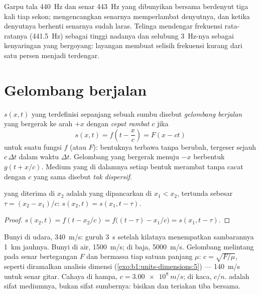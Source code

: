 \begin{example}\label{ex:b1:wave-propagation:tuning}
Garpu tala \qty{440}{Hz} dan senar \qty{443}{Hz} yang dibunyikan
bersama berdenyut tiga kali tiap sekon; mengencangkan senarnya
memperlambat denyutnya, dan ketika denyutnya berhenti senarnya sudah
laras. Telinga mendengar frekuensi rata-ratanya (\qty{441.5}{Hz})
sebagai tinggi nadanya dan selubung \qty{3}{Hz}-nya sebagai kenyaringan
yang bergoyang: layangan membuat selisih frekuensi kurang dari satu
persen menjadi terdengar.
\end{example}

\section{Gelombang berjalan}

\begin{definition}\label{def:b1:wave-propagation:travelling}
 $s(x, t)$ yang terdefinisi sepanjang sebuah sumbu disebut
\emph{gelombang berjalan} yang bergerak ke arah $+x$ dengan
\emph{cepat rambat} $c$ jika
\[
s(x, t) = f\!\left(t - \frac{x}{c}\right) = F(x - ct)
\]
untuk suatu fungsi $f$ (atau $F$): bentuknya terbawa tanpa berubah,
tergeser sejauh $c\,\Delta t$ dalam waktu $\Delta t$. Gelombang yang
bergerak menuju $-x$ berbentuk $g(t + x/c)$. Medium yang di dalamnya
setiap bentuk merambat tanpa cacat dengan $c$ yang sama disebut
\emph{tak dispersif}.
\end{definition}

\begin{proposition}[Tundaan]\label{prop:b1:wave-propagation:delay}
 yang diterima di $x_2$ adalah  yang dipancarkan di
$x_1 < x_2$, tertunda sebesar $\tau = (x_2 - x_1)/c$:
$s(x_2, t) = s(x_1, t - \tau)$.
\end{proposition}

\begin{proof}
$s(x_2, t) = f(t - x_2/c) = f\big((t - \tau) - x_1/c\big) = s(x_1, t - \tau)$.
\end{proof}

\begin{example}\label{ex:b1:wave-propagation:celerities}
Bunyi di udara, \qty{340}{m/s}: guruh \qty{3}{s} setelah kilatnya
menempatkan sambarannya \qty{1}{km} jauhnya. Bunyi di air,
\qty{1500}{m/s}; di baja, \qty{5000}{m/s}. Gelombang melintang pada
senar bertegangan $F$ dan bermassa tiap satuan panjang $\mu$:
$c = \sqrt{F/\mu}$, seperti diramalkan analisis dimensi
(\cref{exo:b1:units-dimensions:5}) --- \qty{140}{m/s} untuk senar gitar.
Cahaya di hampa, $c = \qty{3.00e8}{m/s}$; di kaca, $c/n$.  adalah sifat mediumnya, bukan sifat sumbernya: bisikan dan
teriakan tiba bersama.
\end{example}

